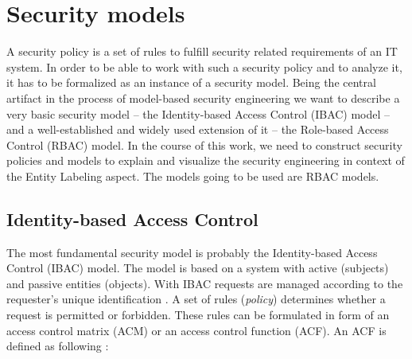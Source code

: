 \documentclass[twoside, openright, 12pt]{book}
\begin{document}
\section{Security models}
\label{security_models}
A security policy is a set of rules to fulfill security related requirements of an IT system.
In order to be able to work with such a security policy and to analyze it, it has to be formalized as an instance of a security model.
Being the central artifact in the process of model-based security engineering we want to describe a very basic security model -- the Identity-based Access Control (IBAC) model -- and a well-established and widely used extension of it -- the Role-based Access Control (RBAC) model.
In the course of this work, we need to construct security policies and models to explain and visualize the security engineering in context of the Entity Labeling aspect.
The models going to be used are RBAC models.





\subsection{Identity-based Access Control}
\label{IBAC}
The most fundamental security model is probably the Identity-based Access Control (IBAC) model.
The model is based on a system with active (subjects) and passive entities (objects).
With IBAC requests are managed according to the requester's unique identification \citep{Lampson74}.
A set of rules (\textit{policy}) determines whether a request is permitted or forbidden.
These rules can be formulated in form of an access control matrix (ACM) or an access control function (ACF).
An ACF is defined as following \citep{Amthor18}:
\end{document}
